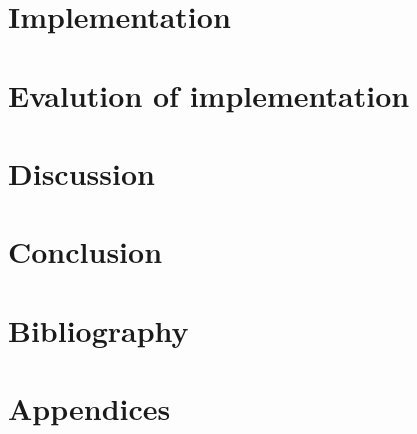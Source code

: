 \documentclass{article}
\begin{document}
\section{Implementation}
\label{sec:impl}

\clearpage

\section{Evalution of implementation}
\label{sec:evaluation}

\clearpage

\section{Discussion}
\label{sec:discussion}

\clearpage

\section{Conclusion}
\label{sec:conclusion}

\clearpage

\section{Bibliography}
\label{sec:biblio}

\clearpage

\section{Appendices}
\label{sec:appendix}

\end{document}
